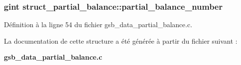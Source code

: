 \subsubsection[{partial\_\-balance\_\-number}]{\setlength{\rightskip}{0pt plus 5cm}gint {\bf struct\_\-partial\_\-balance::partial\_\-balance\_\-number}}\label{structstruct__partial__balance_aa057013082462ce7b8cf2aaa34691d3e}


Définition à la ligne 54 du fichier gsb\_\-data\_\-partial\_\-balance.c.



La documentation de cette structure a été générée à partir du fichier suivant :\begin{DoxyCompactItemize}
\item 
{\bf gsb\_\-data\_\-partial\_\-balance.c}\end{DoxyCompactItemize}
